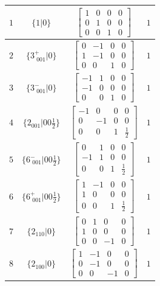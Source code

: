 \documentclass[fleqn,8pt]{jsarticle}
\begin{document}
\begin{longtable}{cccc}
$ 1 $ & $ \{1|0\} $ & $ \begin{bmatrix} 1 & 0 & 0 & 0 \\ 0 & 1 & 0 & 0 \\ 0 & 0 & 1 & 0 \end{bmatrix} $ & $ 1 $ \\ \hline
$ 2 $ & $ \{3^{+}_{\,\,001}|0\} $ & $ \begin{bmatrix} 0 & -1 & 0 & 0 \\ 1 & -1 & 0 & 0 \\ 0 & 0 & 1 & 0 \end{bmatrix} $ & $ 1 $ \\ \hline
$ 3 $ & $ \{3^{-}_{\,\,001}|0\} $ & $ \begin{bmatrix} -1 & 1 & 0 & 0 \\ -1 & 0 & 0 & 0 \\ 0 & 0 & 1 & 0 \end{bmatrix} $ & $ 1 $ \\ \hline
$ 4 $ & $ \{2{}_{001}|0 0 \frac{1}{2}\} $ & $ \begin{bmatrix} -1 & 0 & 0 & 0 \\ 0 & -1 & 0 & 0 \\ 0 & 0 & 1 & \frac{1}{2} \end{bmatrix} $ & $ 1 $ \\ \hline
$ 5 $ & $ \{6^{-}_{\,\,001}|0 0 \frac{1}{2}\} $ & $ \begin{bmatrix} 0 & 1 & 0 & 0 \\ -1 & 1 & 0 & 0 \\ 0 & 0 & 1 & \frac{1}{2} \end{bmatrix} $ & $ 1 $ \\ \hline
$ 6 $ & $ \{6^{+}_{\,\,001}|0 0 \frac{1}{2}\} $ & $ \begin{bmatrix} 1 & -1 & 0 & 0 \\ 1 & 0 & 0 & 0 \\ 0 & 0 & 1 & \frac{1}{2} \end{bmatrix} $ & $ 1 $ \\ \hline
$ 7 $ & $ \{2{}_{110}|0\} $ & $ \begin{bmatrix} 0 & 1 & 0 & 0 \\ 1 & 0 & 0 & 0 \\ 0 & 0 & -1 & 0 \end{bmatrix} $ & $ 1 $ \\ \hline
$ 8 $ & $ \{2{}_{100}|0\} $ & $ \begin{bmatrix} 1 & -1 & 0 & 0 \\ 0 & -1 & 0 & 0 \\ 0 & 0 & -1 & 0 \end{bmatrix} $ & $ 1 $ \\ \hline

\end{longtable}
\end{document}
